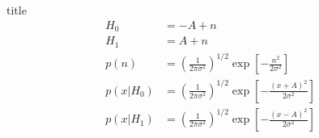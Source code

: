 \begin{frame}{title}
\begin{align*}
H_0&=-A+n\\
H_1&=A+n\\
p(n)&=\left(\frac{1}{2\pi\sigma^2}\right)^{1/2}\exp\left[-\frac{n^2}{2\sigma^2}\right]\\
p(x|H_0)&=\left(\frac{1}{2\pi\sigma^2}\right)^{1/2}\exp\left[-\frac{(x+A)^2}{2\sigma^2}\right]\\
p(x|H_1)&=\left(\frac{1}{2\pi\sigma^2}\right)^{1/2}\exp\left[-\frac{(x-A)^2}{2\sigma^2}\right]
\end{align*}
\end{frame}




